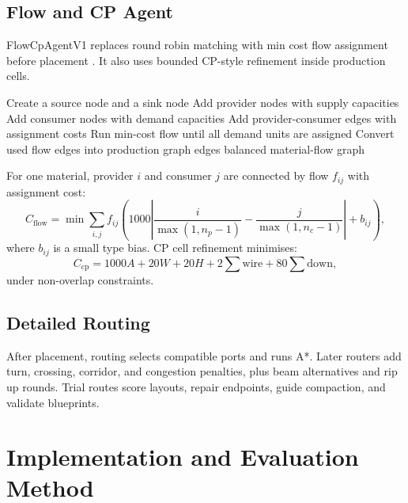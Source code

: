\documentclass[11pt,a4paper]{article}
\begin{document}
\subsection{Flow and CP Agent}

FlowCpAgentV1 replaces round robin matching with min cost flow assignment before placement \cite{ahuja1993network}. It also uses bounded CP-style refinement inside production cells.

\begin{algorithm}[H]
    \caption{Min-cost-flow provider-consumer assignment}
    \label{alg:min-cost-flow}
    \begin{algorithmic}[1]
            \State Create a source node and a sink node
            \State Add provider nodes with supply capacities
            \State Add consumer nodes with demand capacities
            \State Add provider-consumer edges with assignment costs
            \State Run min-cost flow until all demand units are assigned
            \State Convert used flow edges into production graph edges
        \EndFor
        \State \Return balanced material-flow graph
    \end{algorithmic}
\end{algorithm}

For one material, provider $i$ and consumer $j$ are connected by flow $f_{ij}$ with assignment cost:
\begin{equation}
C_{\mathrm{flow}} = \min \sum_{i,j} f_{ij}
\left(1000\left|\frac{i}{\max(1,n_p-1)}-\frac{j}{\max(1,n_c-1)}\right| + b_{ij}\right),
\end{equation}
where $b_{ij}$ is a small type bias. CP cell refinement minimises:
\begin{equation}
C_{\mathrm{cp}} = 1000A + 20W + 20H + 2\sum \mathrm{wire} + 80\sum \mathrm{down},
\end{equation}
under non-overlap constraints.

\subsection{Detailed Routing}

After placement, routing selects compatible ports and runs A*. Later routers add turn, crossing, corridor, and congestion penalties, plus beam alternatives and rip up rounds. Trial routes score layouts, repair endpoints, guide compaction, and validate blueprints.

\section{Implementation and Evaluation Method}
\label{sec:implementation-method}
\end{document}
